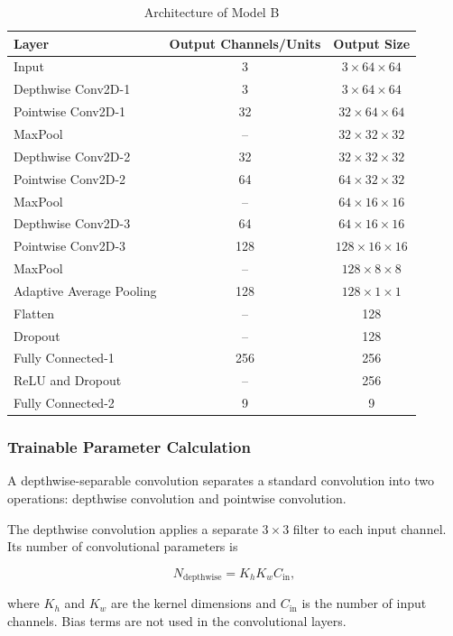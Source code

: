 \documentclass[12pt,a4paper]{article}
\begin{document}
\begin{table}[H]
\centering
\caption{Architecture of Model B}
\label{tab:model_b_architecture}
\small
\begin{tabular}{lcc}
\hline
\textbf{Layer} & \textbf{Output Channels/Units} &
\textbf{Output Size} \\
\hline
Input & 3 & $3\times64\times64$ \\
Depthwise Conv2D-1 & 3 & $3\times64\times64$ \\
Pointwise Conv2D-1 & 32 & $32\times64\times64$ \\
MaxPool & -- & $32\times32\times32$ \\
Depthwise Conv2D-2 & 32 & $32\times32\times32$ \\
Pointwise Conv2D-2 & 64 & $64\times32\times32$ \\
MaxPool & -- & $64\times16\times16$ \\
Depthwise Conv2D-3 & 64 & $64\times16\times16$ \\
Pointwise Conv2D-3 & 128 & $128\times16\times16$ \\
MaxPool & -- & $128\times8\times8$ \\
Adaptive Average Pooling & 128 & $128\times1\times1$ \\
Flatten & -- & 128 \\
Dropout & -- & 128 \\
Fully Connected-1 & 256 & 256 \\
ReLU and Dropout & -- & 256 \\
Fully Connected-2 & 9 & 9 \\
\hline
\end{tabular}
\end{table}

\subsubsection{Trainable Parameter Calculation}

A depthwise-separable convolution separates a standard convolution
into two operations: depthwise convolution and pointwise convolution.

The depthwise convolution applies a separate $3\times3$ filter to each
input channel. Its number of convolutional parameters is

\begin{equation}
N_{\mathrm{depthwise}} = K_h K_w C_{\mathrm{in}},
\end{equation}

where $K_h$ and $K_w$ are the kernel dimensions and
$C_{\mathrm{in}}$ is the number of input channels. Bias terms are
not used in the convolutional layers.
\end{document}
